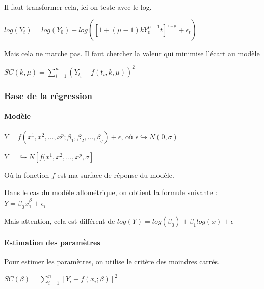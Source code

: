 \documentclass[
]{article}
\begin{document}
Il faut transformer cela, ici on teste avec le log.

\begin{center}
$log(Y_{t})=log(Y_{0})+log([1+( \mu-1)kY_{0}^{\mu-1}t]^{\frac{1}{1- \mu}}+ \epsilon_{t})$
\end{center}

Mais cela ne marche pas. Il faut chercher la valeur qui minimise l'écart
au modèle

\begin{center}
$SC(k, \mu)= \sum_{i=1}^{n}(Y_{t_{i}}-f(t_{i},k, \mu))^2$
\end{center}

\hypertarget{base-de-la-ruxe9gression}{%
\subsubsection{Base de la régression}\label{base-de-la-ruxe9gression}}

\hypertarget{moduxe8le}{%
\paragraph{Modèle}\label{moduxe8le}}

\begin{center}
$Y=f(x^{1},x^{2},...,x^{p}; \beta_{1}, \beta_{2},..., \beta_{q})+ \epsilon$, où $\epsilon \hookrightarrow N(0, \sigma)$

$Y= \hookrightarrow N[f(x^{1},x^{2},...,x^{p}, \sigma]$
\end{center}

Où la fonction \(f\) est ma surface de réponse du modèle.

Dans le cas du modèle allométrique, on obtient la formule suivante :
\(Y= \beta_{0}x_{1}^{\beta_{}}+ \epsilon_{i}\)

Mais attention, cela est différent de
\(log(Y)=log( \beta_{0})+ \beta_{1}log(x)+ \epsilon\)

\hypertarget{estimation-des-paramuxe8tres}{%
\paragraph{Estimation des
paramètres}\label{estimation-des-paramuxe8tres}}

Pour estimer les paramètres, on utilise le critère des moindres carrés.

\begin{center}
$SC( \beta)= \sum_{i=1}^{n}[Y_{i}-f(x_{i}; \beta)]^2$
\end{center}
\end{document}
